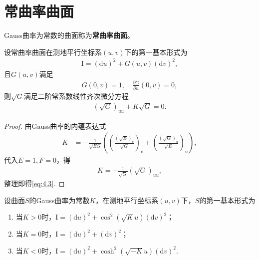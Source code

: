 \documentclass[../../main.tex]{subfiles}%
\begin{document}
\section{常曲率曲面}

\begin{definition}
Gauss曲率为常数的曲面称为\textbf{常曲率曲面}。
\end{definition}

\begin{proposition}
设常曲率曲面在测地平行坐标系$(u,v)$下的第一基本形式为
\begin{align}
\mathrm{I}=(\mathrm{d}u)^2+G(u,v)(\mathrm{d}v)^2,\label{eq:4.1}
\end{align}
且$G(u,v)$满足
\begin{align}
G(0,v)=1,\quad \frac{\partial G}{\partial u}(0,v)=0,\label{eq:4.2}
\end{align}
则$\sqrt{G}$满足二阶常系数线性齐次微分方程
\begin{align}
(\sqrt{G})_{uu}+K\sqrt{G}=0.\label{eq:4.3}
\end{align}
\end{proposition}

\begin{proof}
由Gauss曲率的内蕴表达式
\begin{align*}
K&=-\frac{1}{\sqrt{EG}}\left(\left(\frac{(\sqrt{E})_v}{\sqrt{G}}\right)_v+\left(\frac{(\sqrt{G})_u}{\sqrt{E}}\right)_u\right),
\end{align*}
代入$E=1,F=0$，得
\begin{align*}
K=-\frac{1}{\sqrt{G}}(\sqrt{G})_{uu},
\end{align*}
整理即得\eqref{eq:4.3}.
\end{proof}

\begin{theorem}
设曲面$S$的Gauss曲率为常数$K$，在测地平行坐标系$(u,v)$下，$S$的第一基本形式为
\begin{enumerate}[(1)]
\item 当$K>0$时，$\mathrm{I}=(\mathrm{d}u)^2+\cos^2(\sqrt{K}u)(\mathrm{d}v)^2$；
\item 当$K=0$时，$\mathrm{I}=(\mathrm{d}u)^2+(\mathrm{d}v)^2$；
\item 当$K<0$时，$\mathrm{I}=(\mathrm{d}u)^2+\cosh^2(\sqrt{-K}u)(\mathrm{d}v)^2$.
\end{enumerate}
\end{theorem}
\end{document}

